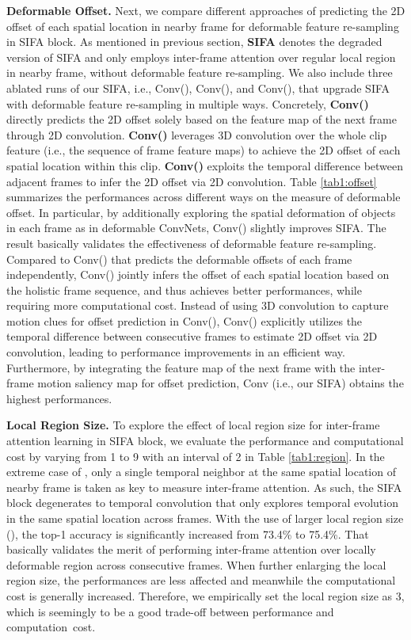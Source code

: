 \documentclass[10pt,twocolumn,letterpaper]{article}
\begin{document}
\textbf{Deformable Offset.}
Next, we compare different approaches of predicting the 2D offset of each spatial location in nearby frame for deformable feature re-sampling in SIFA block. As mentioned in previous section, \textbf{SIFA} denotes the degraded version of SIFA and only employs inter-frame attention over regular local region in nearby frame, without deformable feature re-sampling. We also include three ablated runs of our SIFA, i.e., Conv(), Conv(), and Conv(), that upgrade SIFA with deformable feature re-sampling in multiple ways. Concretely, \textbf{Conv()} directly predicts the 2D offset solely based on the feature map of the next frame through 2D convolution.
\textbf{Conv()} leverages 3D convolution over the whole clip feature (i.e., the sequence of frame feature maps) to achieve the 2D offset of each spatial location within this clip.
\textbf{Conv()} exploits the temporal difference between adjacent frames to infer the 2D offset via 2D convolution.
Table \ref{tab1:offset} summarizes the performances across different ways on the measure of deformable offset.
In particular, by additionally exploring the spatial deformation of objects in each frame as in deformable ConvNets, Conv() slightly improves SIFA. The result basically validates the effectiveness of deformable feature re-sampling. Compared to Conv() that predicts the deformable offsets of each frame independently, Conv() jointly infers the offset of each spatial location based on the holistic frame sequence, and thus achieves better performances, while requiring more computational cost. Instead of using 3D convolution to capture motion clues for offset prediction in Conv(), Conv() explicitly utilizes the temporal difference between consecutive frames to estimate 2D offset via 2D convolution, leading to performance improvements in an efficient way. Furthermore, by integrating the feature map of the next frame with the inter-frame motion saliency map for offset prediction, Conv (i.e., our SIFA) obtains the highest performances.


\textbf{Local Region Size.}
To explore the effect of local region size  for inter-frame attention learning in SIFA block, we evaluate the performance and computational cost by varying  from 1 to 9 with an interval of 2 in Table \ref{tab1:region}. In the extreme case of , only a single temporal neighbor at the same spatial location of nearby frame is taken as key to measure inter-frame attention. As such, the SIFA block degenerates to temporal convolution that only explores temporal evolution in the same spatial location across frames. With the use of larger local region size (), the top-1 accuracy is significantly increased from 73.4\% to 75.4\%. That basically validates the merit of performing inter-frame attention over locally deformable region across consecutive frames. When further enlarging the local region size, the performances are less affected and meanwhile the computational cost is generally increased. Therefore, we empirically set the local region size  as 3, which is seemingly to be a good trade-off between performance and computation~cost.
\end{document}
